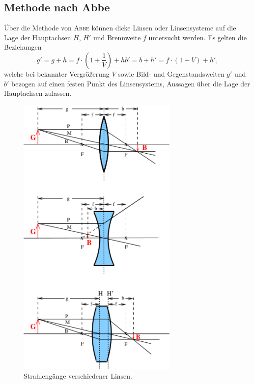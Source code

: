 \subsection{Methode nach \texorpdfstring{Abbe}{\textsc{Abbe}}}
Über die Methode von \textsc{Abbe} können dicke Linsen oder Linsensysteme auf die Lage der Hauptachsen $H$, $H'$ und Brennweite $f$ untersucht werden. 
Es gelten die Beziehungen
\begin{subequations}
	\begin{equation}
	g'=g+h=f\cdot(1+\frac{1}{V})+h
	\end{equation}
	\begin{equation}
	b'=b+h'=f\cdot(1+V)+h',
	\end{equation}
	\label{eq:abbe}
\end{subequations}
welche bei bekannter Vergrößerung $V$ sowie Bild- und Gegenstandsweiten $g'$ und $b'$ bezogen auf einen festen Punkt des Linsensystems, Aussagen über die Lage der Hauptachsen zulassen. 
\begin{figure}[p]
	\centering
	\includegraphics[width=0.7\textwidth]{Bilder/Bildkonstruktionen.pdf}
	\caption{Strahlengänge verschiedener Linsen. \cite{skript}}
	\label{fig:strahlengaenge}
\end{figure}